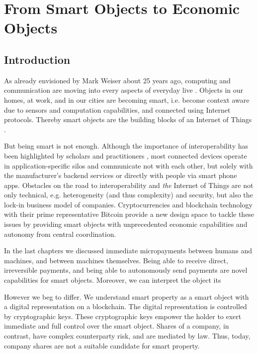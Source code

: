 \chapter{From Smart Objects to Economic Objects}
\label{sec:economicobjects}


\section{Introduction}

As already envisioned by Mark Weiser about 25 years ago, computing and communication are moving into every aspects of everyday live \cite{weiser1991computer}. Objects in our homes, at work, and in our cities are becoming smart, i.e. become context aware due to sensors and computation capabilities, and connected using Internet protocols. Thereby smart objects are the building blocks of an Internet of Things \cite{kortuem2010smart}. 

But being smart is not enough. Although the importance of interoperability has been highlighted by scholars \parencite{zorzi2010} and practitioners \parencite{manyika2015unlocking}, most connected devices operate in application-specific silos and communicate not with each other, but solely with the manufacturer's backend services or directly with people via smart phone apps.
  Obstacles on the road to interoperability and \textit{the} Internet of Things are not only technical, e.g. heterogeneity (and thus complexity) and security, but also the lock-in business model of companies.
  Cryptocurrencies and blockchain technology with their prime representative Bitcoin provide a new design space to tackle these issues by providing smart objects with unprecedented economic capabilities and autonomy from central coordination.

In the last chapters we discussed immediate micropayments between humans and machines, and between machines themselves. Being able to receive direct, irreversible payments, and being able to autonomously send payments are novel capabilities for smart objects. Moreover, we can interpret the object its



However we beg to differ. We understand smart property as a smart object with a digital representation on a blockchain. The digital representation is controlled by cryptographic keys. These cryptographic keys empower the holder to exert immediate and full control over the smart object. Shares of a company, in contrast, have complex counterparty risk, and are mediated by law. Thus, today, company shares are not a suitable candidate for smart property.

